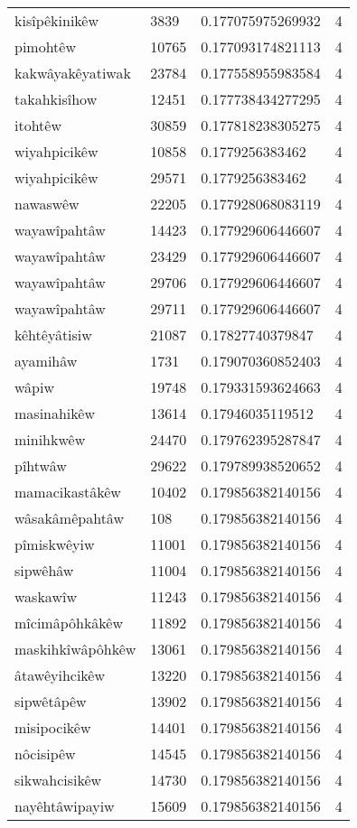 \begin{longtable}{llll}
kisîpêkinikêw & 3839 & 0.177075975269932 & 4 \\
pimohtêw & 10765 & 0.177093174821113 & 4 \\
kakwâyakêyatiwak & 23784 & 0.177558955983584 & 4 \\
takahkisîhow & 12451 & 0.177738434277295 & 4 \\
itohtêw & 30859 & 0.177818238305275 & 4 \\
wiyahpicikêw & 10858 & 0.1779256383462 & 4 \\
wiyahpicikêw & 29571 & 0.1779256383462 & 4 \\
nawaswêw & 22205 & 0.177928068083119 & 4 \\
wayawîpahtâw & 14423 & 0.177929606446607 & 4 \\
wayawîpahtâw & 23429 & 0.177929606446607 & 4 \\
wayawîpahtâw & 29706 & 0.177929606446607 & 4 \\
wayawîpahtâw & 29711 & 0.177929606446607 & 4 \\
kêhtêyâtisiw & 21087 & 0.17827740379847 & 4 \\
ayamihâw & 1731 & 0.179070360852403 & 4 \\
wâpiw & 19748 & 0.179331593624663 & 4 \\
masinahikêw & 13614 & 0.17946035119512 & 4 \\
minihkwêw & 24470 & 0.179762395287847 & 4 \\
pîhtwâw & 29622 & 0.179789938520652 & 4 \\
mamacikastâkêw & 10402 & 0.179856382140156 & 4 \\
wâsakâmêpahtâw & 108 & 0.179856382140156 & 4 \\
pîmiskwêyiw & 11001 & 0.179856382140156 & 4 \\
sipwêhâw & 11004 & 0.179856382140156 & 4 \\
waskawîw & 11243 & 0.179856382140156 & 4 \\
mîcimâpôhkâkêw & 11892 & 0.179856382140156 & 4 \\
maskihkîwâpôhkêw & 13061 & 0.179856382140156 & 4 \\
âtawêyihcikêw & 13220 & 0.179856382140156 & 4 \\
sipwêtâpêw & 13902 & 0.179856382140156 & 4 \\
misipocikêw & 14401 & 0.179856382140156 & 4 \\
nôcisipêw & 14545 & 0.179856382140156 & 4 \\
sikwahcisikêw & 14730 & 0.179856382140156 & 4 \\
nayêhtâwipayiw & 15609 & 0.179856382140156 & 4 \\

\end{longtable}
